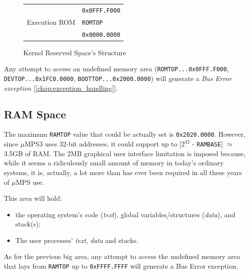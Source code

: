 \documentclass[12pt,a4paper,openright,twoside]{report}
\begin{document}
\begin{figure}[ht]
\begin{tabular}{cl}
		\multicolumn{1}{|c|}{}                                              & \multirow{2}{*}{\texttt{0x0FFF.F000}} \\ \cline{1-1}
		\multicolumn{1}{|l|}{\multirow{2}{*}{\cellcolor{gray}}}             &                                       \\ [-3ex]
		\multicolumn{1}{|l|}{\cellcolor{gray}}                              & \multirow{2}{*}{\texttt{ROMTOP}}      \\ \cline{1-1}
		\multicolumn{1}{|c|}{\multirow{2}{*}{Execution ROM}}                &                                       \\ [-1ex]
		\multicolumn{1}{|c|}{}                                              & \multirow{2}{*}{\texttt{0x0000.0000}} \\ \cline{1-1}
		\multicolumn{1}{l}{}                                                &
	\end{tabular}
	\caption{Kernel Reserved Space's Structure}
	\label{fig:kernel_reserved_space}
\end{figure}
Any attempt to access an undefined memory area (\texttt{ROMTOP...0x0FFF.F000}, \texttt{DEVTOP...0x1FC0.0000}, \texttt{BOOTTOP...0x2000.0000}) will generate a \textit{Bus Error exception} [\autoref{chap:exception_handling}].

\subsection{RAM Space}
The maximum \texttt{RAMTOP} value that could be actually set is \texttt{0x2020.0000}.
However, since $\mu$MPS3 uses 32-bit addresses, it could support up to [$2^{32}$ - \texttt{RAMBASE}] $\simeq$ 3.5GB of RAM.
The 2MB graphical user interface limitation is imposed because, while it seems a ridiculously small amount of memory in today's ordinary systems, it is, actually, a lot more than has ever been required in all these years of $\mu$MPS use.

This area will hold:
\begin{itemize}
	\item the operating system's code (\textit{text}), global variables/structures (\textit{data}), and stack(s);
	\item The user processes' \textit{text}, \textit{data} and stacks.
\end{itemize}
As for the previous big area, any attempt to access the undefined memory area that lays from \texttt{RAMTOP} up to \texttt{0xFFFF.FFFF} will generate a Bus Error exception.
\end{document}
